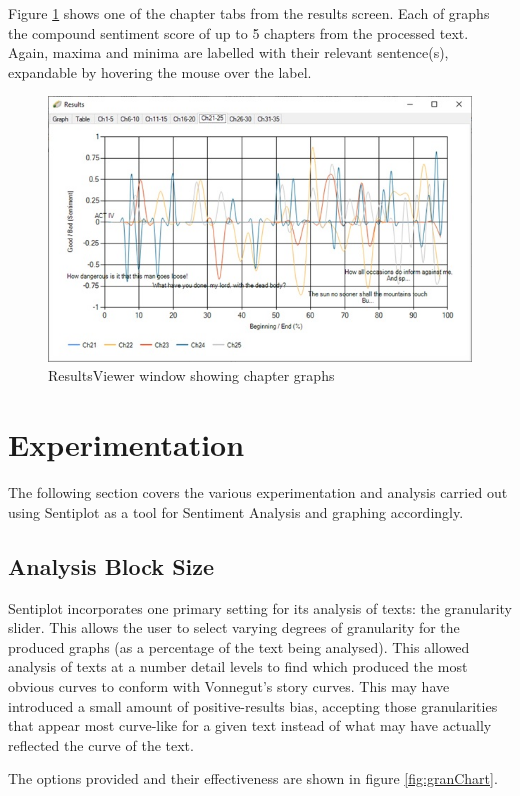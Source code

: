 \documentclass{article}
\begin{document}
        Figure \ref{fig:resultschapters} shows one of the chapter tabs from the results screen. Each of graphs the compound sentiment score of up to 5 chapters from the processed text. Again, maxima and minima are labelled with their relevant sentence(s), expandable by hovering the mouse over the label.
        \begin{figure}[H]
            \includegraphics[width=1\textwidth]{Misc/resultschapters}
            \caption{ResultsViewer window showing chapter graphs}
            \label{fig:resultschapters}
        \end{figure}
\newpage
\section{Experimentation}
The following section covers the various experimentation and analysis carried out using Sentiplot as a tool for Sentiment Analysis and graphing accordingly.
    \subsection{Analysis Block Size}
        Sentiplot incorporates one primary setting for its analysis of texts: the granularity slider. This allows the user to select varying degrees of granularity for the produced graphs (as a percentage of the text being analysed). This allowed analysis of texts at a number detail levels to find which produced the most obvious curves to conform with Vonnegut's story curves. This may have introduced a small amount of positive-results bias, accepting those granularities that appear most curve-like for a given text instead of what may have actually reflected the curve of the text.

        The options provided and their effectiveness are shown in figure \ref{fig:granChart}.
        
\end{document}
